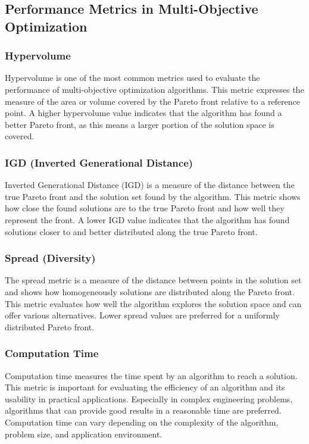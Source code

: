 \subsection{Performance Metrics in Multi-Objective Optimization}
\subsubsection{Hypervolume}
Hypervolume is one of the most common metrics used to evaluate the performance of multi-objective optimization algorithms. This metric expresses the measure of the area or volume covered by the Pareto front relative to a reference point. A higher hypervolume value indicates that the algorithm has found a better Pareto front, as this means a larger portion of the solution space is covered.

\subsubsection{IGD (Inverted Generational Distance)}
Inverted Generational Distance (IGD) is a measure of the distance between the true Pareto front and the solution set found by the algorithm. This metric shows how close the found solutions are to the true Pareto front and how well they represent the front. A lower IGD value indicates that the algorithm has found solutions closer to and better distributed along the true Pareto front.

\subsubsection{Spread (Diversity)}
The spread metric is a measure of the distance between points in the solution set and shows how homogeneously solutions are distributed along the Pareto front. This metric evaluates how well the algorithm explores the solution space and can offer various alternatives. Lower spread values are preferred for a uniformly distributed Pareto front.

\subsubsection{Computation Time}
Computation time measures the time spent by an algorithm to reach a solution. This metric is important for evaluating the efficiency of an algorithm and its usability in practical applications. Especially in complex engineering problems, algorithms that can provide good results in a reasonable time are preferred. Computation time can vary depending on the complexity of the algorithm, problem size, and application environment.  